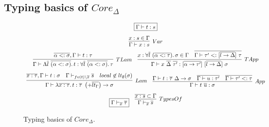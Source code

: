 \documentclass[11pt]{article}
\newcommand{\mathframebox}[1]{\framebox{$\displaystyle #1$}}
\newcommand{\ap}{~}
\begin{document}
    \subsection{Typing basics of $Core_\Delta$}

    \begin{figure}
        \begin{gather*}
            \mathframebox{\Gamma\vdash t : s} \\[0.5em]
            \infer[Var]{\Gamma\vdash x : s}{x : s \in \Gamma} \\
            \begin{array}{cc}
                \infer[TLam]{
                    \Gamma\vdash\Lambda\overline{l}\ap\overline{(\alpha <: \sigma)}\ldotp t : \forall\overline{l}\ap\overline{(\alpha <: \sigma)}\ldotp\tau
                }{
                    \overline{\alpha <: \sigma}, \Gamma\vdash t : \tau
                } &
                \infer[TApp]{
                    \Gamma\vdash x\ap\overline{\Delta}\ap\overline{\tau'} : [\overline{\alpha\to\tau'}]\ap[\overline{l\to\Delta}]\ap\sigma
                }{
                    x : \forall\overline{l}\ap(\overline{\alpha <: \tau})\ldotp \sigma \in \Gamma
                    &
                    \overline{\Gamma\vdash\tau' <: [\overline{l\to\Delta}]\ap\tau}
                }
            \end{array} \\[0.5em]
            \begin{array}{cc}
                \infer[Lam]{
                    \Gamma\vdash \lambda \overline{x : \tau} \ldotp t :  \overline{\tau}~ \left(+\overline{lt_\Gamma}\right) \to \sigma
                }{
                    \overline{x : \tau}, \Gamma\vdash t : \sigma
                    &
                    \Gamma\vdash_{fv(t)\setminus \overline{x}}\overline{s}
                    &
                    local \not\in lt_\emptyset(\sigma)
                } &
                \infer[App]{
                    \Gamma\vdash t \ap \overline{u} : \sigma
                } {
                    \Gamma\vdash t : \overline{\tau}~\Delta\to\sigma
                    &
                    \overline{\Gamma\vdash u : \tau'}
                    &
                    \overline{\Gamma\vdash\tau' <: \tau}
                }
            \end{array} \\[0.5em]
            \begin{array}{cc}
                \mathframebox{\Gamma\vdash_{\overline{x}}\overline{\tau}} &
                \infer[TypesOf]{\Gamma\vdash_{\overline{x}}\overline{s}}{\overline{x : s} \subset \Gamma}
            \end{array}
        \end{gather*}
        \caption{Typing basics of $Core_\Delta$.}
        \label{fig:core-functions}
    \end{figure}
\end{document}
